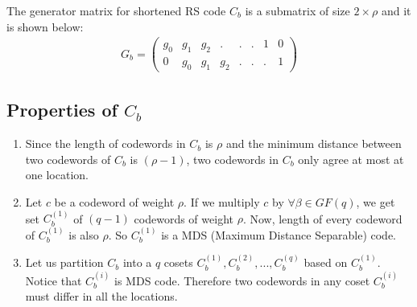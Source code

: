 The generator matrix for shortened RS code $C_b$ is a submatrix of size $2 \times \rho$ and it is shown below:
\begin{align*}
 G_b= \begin{pmatrix}
g_0 & g_1 & g_2 & . & . & . & 1 & 0\\
0 & g_0 & g_1 & g_2 & . & . & . &1 \end{pmatrix}
\end{align*} 

\subsection{Properties of $C_b$} 
\begin{enumerate}
\item Since the length of codewords in $C_b$ is $\rho$ and the minimum distance between two codewords of $C_b$ is $(\rho-1)$, two codewords in $C_b$ only agree at most at one location.
\item Let $c$ be a codeword of weight $\rho$. If we multiply $c$ by $\forall \beta \in GF(q)$, we get set $C_b^{(1)}$ of $(q-1)$ codewords of weight $\rho$. 
    Now, length of every codeword of $C_b^{(1)}$ is also $\rho$. So $C_b^{(1)}$ is a MDS (Maximum Distance Separable) code.
\item Let us partition $C_b$ into a $q$ cosets $C_b^{(1)},C_b^{(2)},...,C_b^{(q)}$ based on $C_b^{(1)}$. Notice that $C_b^{(i)}$ is MDS code. 
    Therefore two codewords in any coset $C_b^{(i)}$ must differ in all the locations. 
\end{enumerate}

